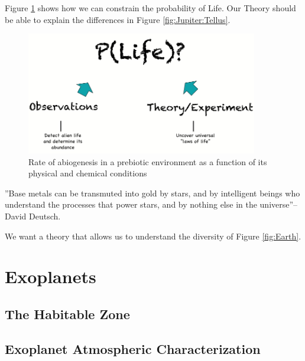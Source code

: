 \documentclass[]{article}
\begin{document}
Figure \ref{fig:P:Life} shows how we can constrain the probability of Life.  Our Theory should be able to explain the differences in Figure \ref{fig:Jupiter:Tellus}.

\begin{figure}[H]
	\caption{Rate of abiogenesis in a prebiotic environment as a function of its physical and chemical conditions}\label{fig:P:Life}
	\includegraphics[width=0.9\textwidth]{P_Life}
\end{figure}

''Base metals can be transmuted into gold by stars, and by intelligent beings who understand the processes that power stars, and by nothing else in the universe''--David Deutsch\cite{deutsch2011beginning}.

We want a theory that allows us to understand the diversity of Figure \ref{fig:Earth}.

\section{Exoplanets}

\subsection{The Habitable Zone}

\cite{fujii2018exoplanet}
\cite{villanueva2015unique}
\cite{kasting1993habitable}
\cite{kopparapu2013habitable}
\cite{nasa2019Explonet}

\subsection{Exoplanet Atmospheric Characterization}

\cite{sagan1993search}
\cite{kaltenegger2017characterize}
\cite{fujii2018exoplanet}
\cite{nasa2019Explonet}
\cite{robinson2011earth}
\cite{marois2010images}
\cite{greenbaum2018gpi}
\cite{deming2013infrared}
\cite{knutson2007map}
\end{document}
